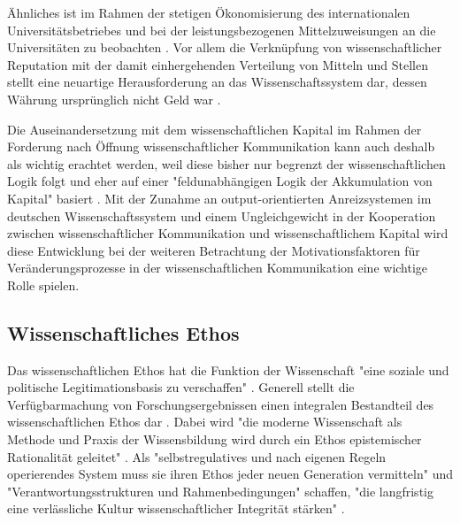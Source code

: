 Ähnliches ist im Rahmen der stetigen Ökonomisierung des internationalen Universitätsbetriebes \cite{brembs2015open} und bei der leistungsbezogenen Mittelzuweisungen an die Universitäten zu beobachten \cite[:12]{Neidhardt_2006}. Vor allem die Verknüpfung von wissenschaftlicher Reputation mit der damit einhergehenden Verteilung von Mitteln und Stellen stellt eine neuartige Herausforderung an das Wissenschaftssystem dar, dessen Währung ursprünglich nicht Geld war \cite{hanekop_2006}.

Die Auseinandersetzung mit dem wissenschaftlichen Kapital im Rahmen der Forderung nach Öffnung wissenschaftlicher Kommunikation kann auch deshalb als wichtig erachtet werden, weil diese bisher nur begrenzt der wissenschaftlichen Logik folgt und eher auf einer "feldunabhängigen Logik der Akkumulation von Kapital" basiert \cite{herb_2006}. Mit der Zunahme an output-orientierten Anreizsystemen im deutschen Wissenschaftssystem \cite{osterloh2008anreize} und einem Ungleichgewicht in der Kooperation zwischen wissenschaftlicher Kommunikation und wissenschaftlichem Kapital wird diese Entwicklung bei der weiteren Betrachtung der Motivationsfaktoren für Veränderungsprozesse in der wissenschaftlichen Kommunikation eine wichtige Rolle spielen.

\subsection{Wissenschaftliches Ethos}

Das wissenschaftlichen Ethos hat die Funktion der Wissenschaft "eine soziale und politische Legitimationsbasis zu verschaffen" \cite{descher_2012_ethos}. Generell stellt die Verfügbarmachung von Forschungsergebnissen einen integralen Bestandteil des wissenschaftlichen Ethos dar \cite{Fangerau_2014}. Dabei wird "die moderne Wissenschaft als Methode und Praxis der Wissensbildung wird durch ein Ethos epistemischer Rationalität geleitet" \cite{Oezmen_2015}. Als "selbstregulatives und nach eigenen Regeln operierendes System muss sie ihren Ethos jeder neuen Generation vermitteln" und "Verantwortungsstrukturen und Rahmenbedingungen" schaffen, "die langfristig eine verlässliche Kultur wissenschaftlicher Integrität stärken" \cite[:7]{wr_2015_wissenschaft_integritaet}.


